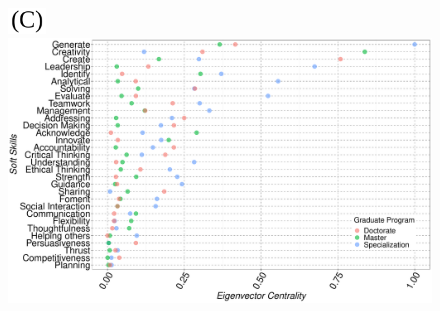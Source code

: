\documentclass{article}
\begin{document}
\begin{figure}[htbp]
  \begin{minipage}[b]{1\textwidth}
    \centering
\includegraphics[width=1cm]{(C).png}    \includegraphics[width=\textwidth]{F6.pdf}
    \label{fig:figure3}
  \end{minipage}
  \label{fig:three_figures}
\end{figure}
\end{document}
